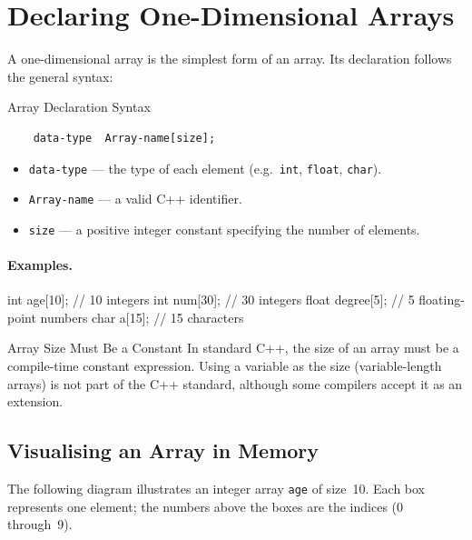 \section{Declaring One-Dimensional Arrays}
\label{sec:declaring-arrays}

A one-dimensional array is the simplest form of an array. Its declaration
follows the general syntax:

\begin{conceptbox}{Array Declaration Syntax}
\begin{verbatim}
    data-type  Array-name[size];
\end{verbatim}
\begin{itemize}
    \item \texttt{data-type} --- the type of each element
          (e.g.\ \texttt{int}, \texttt{float}, \texttt{char}).
    \item \texttt{Array-name} --- a valid C++ identifier.
    \item \texttt{size} --- a positive integer constant specifying
          the number of elements.
\end{itemize}
\end{conceptbox}

\paragraph{Examples.}

\begin{cppcode}
int   age[10];    // 10 integers
int   num[30];    // 30 integers
float degree[5];  // 5 floating-point numbers
char  a[15];      // 15 characters
\end{cppcode}

\begin{warningbox}{Array Size Must Be a Constant}
In standard C++, the size of an array must be a compile-time constant
expression. Using a variable as the size (variable-length arrays) is not
part of the C++ standard, although some compilers accept it as an extension.
\end{warningbox}

\subsection*{Visualising an Array in Memory}

The following diagram illustrates an integer array \texttt{age} of size~10.
Each box represents one element; the numbers above the boxes are the indices
(0 through~9).

